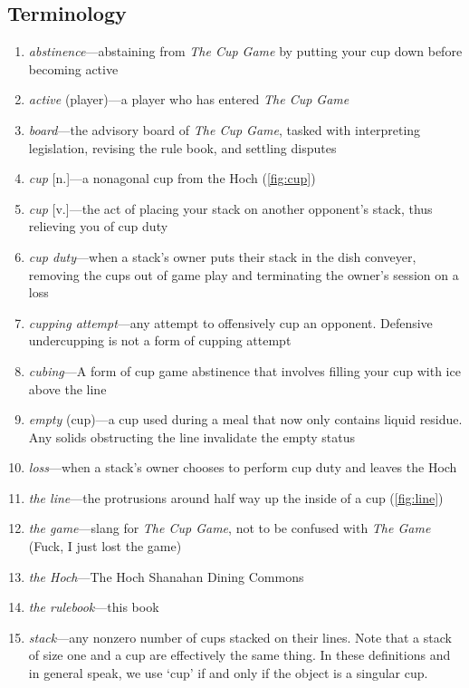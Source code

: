\documentclass[12pt]{IEEEtran}
\begin{document}
\subsection{Terminology}\label{section:terminology}
\begin{enumerate}
    \item \textit{abstinence}---abstaining from \textit{The Cup Game} by putting your cup down before becoming active
    \item \textit{active} (player)---a player who has entered \textit{The Cup Game}
    \item \textit{board}---the advisory board of \textit{The Cup Game}, tasked with interpreting legislation, revising the rule book, and settling disputes
    \item \textit{cup} [n.]---a nonagonal cup from the Hoch (\ref{fig:cup})
    \item \textit{cup} [v.]---the act of placing your stack on another opponent's stack, thus relieving you of cup duty
    \item \textit{cup duty}---when a stack's owner puts their stack in the dish conveyer, removing the cups out of game play and terminating the owner's session on a loss
    \item \textit{cupping attempt}---any attempt to offensively cup an opponent. Defensive undercupping is not a form of cupping attempt
    \item \textit{cubing}---A form of cup game abstinence that involves filling your cup with ice above the line
    \item \textit{empty} (cup)---a cup used during a meal that now only contains liquid residue. Any solids obstructing the line invalidate the empty status
    \item \textit{loss}---when a stack's owner chooses to perform cup duty and leaves the Hoch
    \item \textit{the line}---the protrusions around half way up the inside of a cup (\ref{fig:line})
    \item \textit{the game}---slang for \textit{The Cup Game}, not to be confused with \textit{The Game} (Fuck, I just lost the game)
    \item \textit{the Hoch}---The Hoch Shanahan Dining Commons
    \item \textit{the rulebook}---this book
    \item \textit{stack}---any nonzero number of cups stacked on their lines. Note that a stack of size one and a cup are effectively the same thing. In these definitions and in general speak, we use `cup' if and only if the object is a singular cup.

\end{enumerate}
\end{document}
